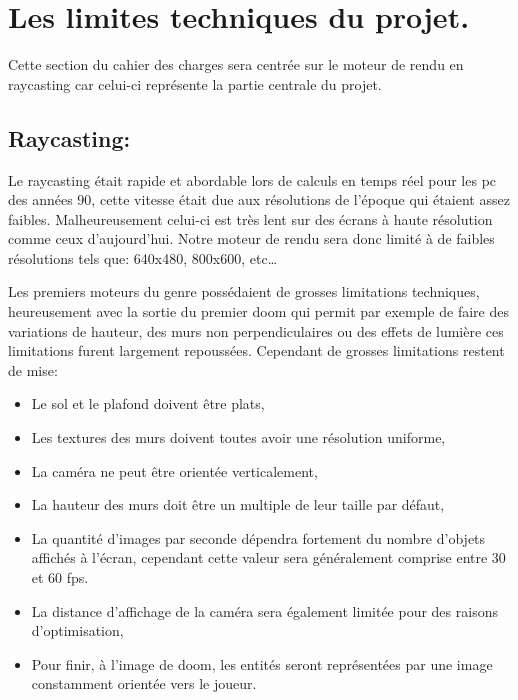 \documentclass[french, 12pt]{article}
\begin{document}
    
    \newpage


    \color{black}\section{Les limites techniques du projet.}\begin{flushleft}
        Cette section du cahier des charges sera centrée sur le moteur de rendu en raycasting car celui-ci représente la partie centrale du projet.
    
        \subsection{Raycasting:}
        \vspace*{1mm}

        Le raycasting était rapide et abordable lors de calculs en temps réel pour les pc des années 90, cette vitesse était due aux résolutions de l’époque qui étaient assez faibles. Malheureusement celui-ci est très lent sur des écrans à haute résolution comme ceux d’aujourd’hui. Notre moteur de rendu sera donc limité à de faibles résolutions tels que: 640x480, 800x600, etc… \newline

        Les premiers moteurs du genre possédaient de grosses limitations techniques, heureusement avec la sortie du premier doom qui permit par exemple de faire des variations de hauteur, des murs non perpendiculaires ou des effets de lumière ces limitations furent largement repoussées. Cependant de grosses limitations restent de mise: \newline

        \begin{itemize}
            \item Le sol et le plafond doivent être plats,
            \item Les textures des murs doivent toutes avoir une résolution uniforme,
            \item La caméra ne peut être orientée verticalement,
            \item La hauteur des murs doit être un multiple de leur taille par défaut,
            \item La quantité d’images par seconde dépendra fortement du nombre d’objets affichés à l’écran, cependant cette valeur sera généralement comprise entre 30 et 60 fps.
            \item La distance d’affichage de la caméra sera également limitée pour des raisons d'optimisation,
            \item Pour finir, à l'image de doom, les entités seront représentées par une image constamment orientée vers le joueur.
        \end{itemize}



    \end{flushleft}
\end{document}
